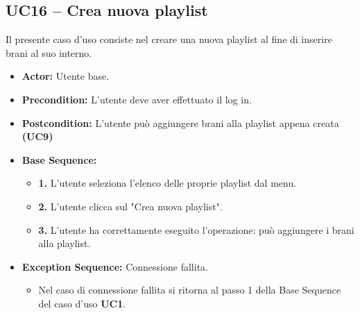 \subsection{UC16 -- Crea nuova playlist}
Il presente caso d'uso consiste nel creare una nuova playlist al fine di inserire brani al suo interno.
\begin{itemize}
    \item \textbf{Actor:} Utente base.
    \item \textbf{Precondition:} L'utente deve aver effettuato il log in.
    \item \textbf{Postcondition:} L'utente può aggiungere brani alla playlist appena creata \textbf{(UC9)}
    \item \textbf{Base Sequence:}
    \begin{itemize}
        \item \textbf{1.} L'utente seleziona l'elenco delle proprie playlist dal menu.
        \item \textbf{2.} L'utente clicca sul "Crea nuova playlist".
        \item \textbf{3.} L'utente ha correttamente eseguito l'operazione: può aggiungere i brani alla playlist.
    \end{itemize}
    \item \textbf{Exception Sequence:} Connessione fallita.
    \begin{itemize}
        \item Nel caso di connessione fallita si ritorna al passo 1 della Base Sequence del caso d'uso \textbf{UC1}.
    \end{itemize}
\end{itemize}
\vspace{1cm}

